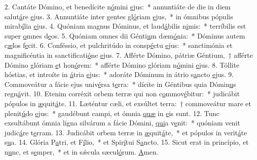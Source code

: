 2. Cantáte Dómino, et benedícite n\uline{ó}mini \uline{e}jus:~* annuntiáte de die in diem salut\uline{á}re \uline{e}jus.
3. Annuntiáte inter gentes gl\uline{ó}riam \uline{e}jus,~* in ómnibus pópulis mirab\uline{í}lia \uline{e}jus.
4. Quóniam magnus Dóminus, et laud\uline{á}bilis n\uline{i}mis:~* terríbilis est super \uline{o}mnes d\uline{e}os.
5. Quóniam omnes dii Génti\uline{u}m dæm\uline{ó}nia:~* Dóminus autem c\uline{æ}los f\uline{e}cit.
6. Conféssio, et pulchritúdo in consp\uline{é}ctu \uline{e}jus:~* sanctimónia et magnificéntia in sanctificati\uline{ó}ne \uline{e}jus.
7. Afférte Dómino, pátriæ Géntium,~† afférte Dómino glóriam \uline{e}t hon\uline{ó}rem:~* afférte Dómino glóriam n\uline{ó}mini \uline{e}jus.
8. Tóllite hóstias, et introíte in \uline{á}tria \uline{e}jus:~* adoráte Dóminum in átrio s\uline{a}ncto \uline{e}jus.
9. Commoveátur a fácie ejus univ\uline{é}rsa t\uline{e}rra:~* dícite in Géntibus quia Dómin\uline{u}s regn\uline{á}vit.
10. Etenim corréxit orbem terræ qui non c\uline{o}mmov\uline{é}bitur:~* judicábit pópulos in \uline{æ}quit\uline{á}te.
11. Læténtur cæli, et exsúltet terra:~† commoveátur mare et plenit\uline{ú}do \uline{e}jus:~* gaudébunt campi, et ómnia \uline{quæ} in \uline{e}is sunt.
12. Tunc exsultábunt ómnia ligna silvárum a fácie Dómini, \uline{qui}a v\uline{e}nit:~* quóniam venit judic\uline{á}re t\uline{e}rram.
13. Judicábit orbem terræ in \uline{æ}quit\uline{á}te,~* et pópulos in verit\uline{á}te s\uline{u}a.
14. Glória P\uline{a}tri, et F\uline{í}lio,~* et Spir\uline{í}tui S\uline{a}ncto.
15. Sicut erat in princípio, et n\uline{u}nc, et s\uline{e}mper,~* et in sǽcula sæcul\uline{ó}rum. \uline{A}men.
